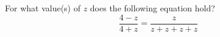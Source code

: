 For what value(s) of $z$ does the following equation hold?
\[
\dfrac{4-z}{4+z}=\dfrac{z}{z+z+z+z}
\]
